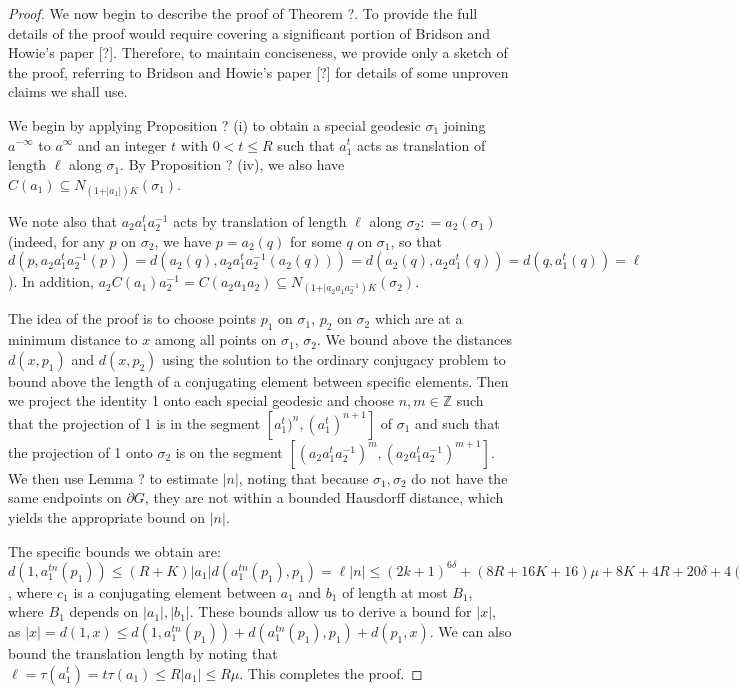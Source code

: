 \documentclass[12pt]{article}
\newcommand{\vs}{\vskip10pt}
\begin{document}
	\begin{proof}
		
		We now begin to describe the proof of Theorem ?. To provide the full details of the proof would require covering a significant portion of Bridson and Howie's paper [?]. Therefore, to maintain conciseness, we provide only a sketch of the proof, referring to Bridson and Howie's paper [?] for details of some unproven claims we shall use. 
		
		\vs 
		
		We begin by applying Proposition ? (i) to obtain a special geodesic $\sigma_1$ joining $a^{-\infty}$ to $a^{\infty}$ and an integer $t$ with $0 < t \leq R$ such that $a_1^t$ acts as translation of length $\ell$ along $\sigma_1$. By Proposition ? (iv), we also have $C(a_1) \subseteq N_{(1 + \vert a_1 \vert)K}(\sigma_1)$. 
		
		\vs 
		
		We note also that $a_2 a_1^t a_2^{-1}$ acts by translation of length $\ell$ along $\sigma_2 : = a_2 (\sigma_1)$ (indeed, for any $p$ on $\sigma_2$, we have $p = a_2 (q)$ for some $q$ on $\sigma_1$, so that $d(p, a_2 a_1^t a_2^{-1}(p) )= d(a_2(q), a_2 a_1^t a_2^{-1}(a_2(q))) = d(a_2(q), a_2 a_1^t (q)) = d(q, a_1^t (q)) = \ell$). In addition, $a_2C(a_1)a_2^{-1} = C(a_2 a_1 a_2) \subseteq N_{(1 + \vert a_2 a_1 a_2^{-1})K}(\sigma_2)$. 
		
		\vs 
		
		The idea of the proof is to choose points $p_1$ on $\sigma_1$, $p_2$ on $\sigma_2$ which are at a minimum distance to $x$ among all points on $\sigma_1$, $\sigma_2$. We bound above the distances $d(x, p_1)$ and $d(x, p_2)$ using the solution to the ordinary conjugacy problem to bound above the length of a conjugating element between specific elements. Then we project the identity 1 onto each special geodesic and choose $n,m \in \mathbb{Z}$ such that the projection of 1 is in the segment $[a_1^t)^n, (a_1^t)^{n+1}]$ of $\sigma_1$ and such that the projection of 1 onto $\sigma_2$ is on the segment $[(a_2 a_1^t a_2^{-1})^m, (a_2 a_1^t a_2^{-1})^{m+1}]$. We then use Lemma ? to estimate $\vert n \vert$, noting that because $\sigma_1, \sigma_2$ do not have the same endpoints on $\partial G$, they are not within a bounded Hausdorff distance, which yields the appropriate bound on $\vert n \vert$. 
		
		\vs 
		
		The specific bounds we obtain are: $d(1, a_1^{tn}(p_1)) \leq (R+K) \vert a_1 \vert d(a_1^{tn}(p_1), p_1) = \ell \vert n \vert \leq (2k + 1)^{6 \delta} + (8 R + 16 K + 16)\mu + 8K + 4R + 20 \delta + 4(2k + 1)^{4 \delta}, d(p_1, x) \leq (1 + \vert a_1 \vert )K + \vert c_1 \vert \leq (1 + \vert a_1 \vert )K + B_1$, where $c_1$ is a conjugating element between $a_1$ and $b_1$ of length at most $B_1$, where $B_1$ depends on $\vert a_1 \vert, \vert b_1 \vert$.  These bounds allow us to derive a bound for $\vert x \vert$, as $\vert x \vert = d(1,x) \leq d(1, a_1^{tn}(p_1)) + d(a_1^{tn}(p_1), p_1) + d(p_1, x)$. We can also bound the translation length by noting that $\ell = \tau(a_1^t) = t \tau(a_1) \leq R \vert a_1 \vert \leq R \mu$. This completes the proof. 
		

\end{proof}
\end{document}
